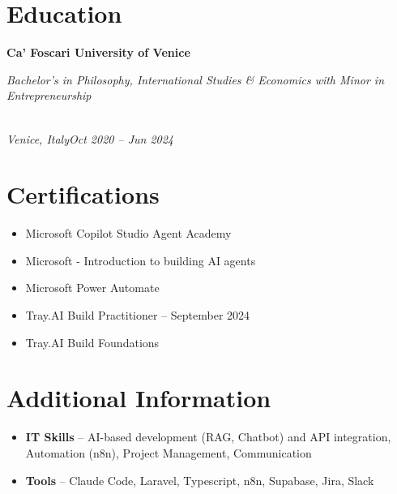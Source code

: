 \documentclass[a4paper,10pt]{article}
\newcommand{\role}[4]{\vspace{3pt}\noindent\hspace{0.6em}\parbox[t]{0.38\textwidth}{\raggedright\textbf{#1}}\hfill\parbox[t]{0.58\textwidth}{\raggedleft\textit{#2}}\\{\textit{#3}\hfill\textit{#4}}\vspace{1pt}}
\begin{document}
\section{Education}
\role{Ca' Foscari University of Venice}{Bachelor's in Philosophy, International Studies \& Economics with Minor in Entrepreneurship}{Venice, Italy}{Oct 2020 -- Jun 2024}

\section{Certifications}
\begin{itemize}
\item Microsoft Copilot Studio Agent Academy
\item Microsoft - Introduction to building AI agents
\item Microsoft Power Automate
\item Tray.AI Build Practitioner -- September 2024
\item Tray.AI Build Foundations
\end{itemize}

\section{Additional Information}
\begin{itemize}
\item \textbf{IT Skills} -- AI-based development (RAG, Chatbot) and API integration, Automation (n8n), Project Management, Communication
\item \textbf{Tools} -- Claude Code, Laravel, Typescript, n8n, Supabase, Jira, Slack
\end{itemize}
\end{document}
